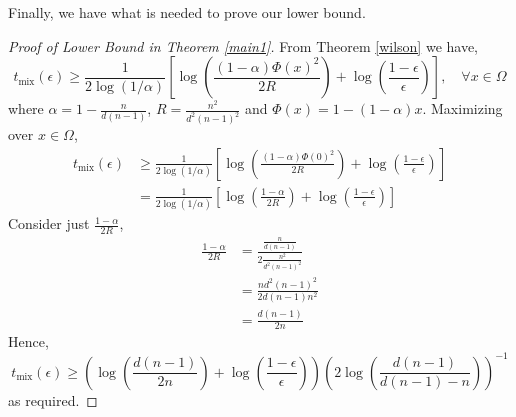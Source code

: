 \documentclass{article}
\theoremstyle{definition}
\theoremstyle{definition}
\theoremstyle{definition}
\theoremstyle{definition}
\theoremstyle{named}
\begin{document}
\noindent Finally, we have what is needed to prove our lower bound. 
   \begin{proof}[Proof of Lower Bound in Theorem \ref{main1}]
      From Theorem \ref{wilson} we have,
   \[t_\text{mix}(\epsilon) \geq \frac{1}{2\log(1/\alpha)}\left[\log \left(\frac{(1-\alpha)\Phi(x)^2}{2R}\right) + \log\left(\frac{1-\epsilon}{\epsilon}\right)\right], \quad \forall x\in \Omega\]
   where $\alpha = 1-\frac{n}{d(n-1)}$, $R=\frac{n^2}{d^2(n-1)^2}$ and $\Phi(x) = 1-(1-\alpha)x$. Maximizing over $x\in \Omega$,
   \begin{align*}
   t_\text{mix}(\epsilon) &\geq \frac{1}{2\log(1/\alpha)}\left[\log \left(\frac{(1-\alpha)\Phi(0)^2}{2R}\right) + \log\left(\frac{1-\epsilon}{\epsilon}\right)\right]\\
   &= \frac{1}{2\log(1/\alpha)}\left[\log \left(\frac{1-\alpha}{2R}\right) + \log\left(\frac{1-\epsilon}{\epsilon}\right)\right]
   \end{align*}
   Consider just $\frac{1-\alpha}{2R}$,
   \begin{align*}
      \frac{1-\alpha}{2R}&= \frac{\frac{n}{d(n-1)}}{2\frac{n^2}{d^2(n-1)^2}}\\
      &= \frac{nd^2(n-1)^2}{2d(n-1)n^2}\\
      &= \frac{d(n-1)}{2n}
   \end{align*}
   Hence,
   \[t_\text{mix}(\epsilon) \geq \left(\log \left(\frac{d(n-1)}{2n}\right) + \log\left(\frac{1-\epsilon}{\epsilon}\right)\right)\left(2\log\left(\frac{d(n-1)}{d(n-1)-n}\right)\right)^{-1}\]
   as required.
   \end{proof}
\end{document}
